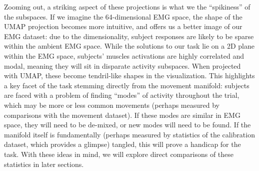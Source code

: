 \documentclass[../main.tex]{subfiles}
\begin{document}
Zooming out, a striking aspect of these projections is what we the ``spikiness'' of the subspaces. If we imagine the 64-dimensional EMG space, the shape of the UMAP projection becomes more intuitive, and offers us a better image of our EMG dataset: due to the dimensionality, subject responses are likely to be sparse within the ambient EMG space. While the solutions to our task lie on a 2D plane within the EMG space, subjects' muscles activations are highly correlated and modal, meaning they will sit in disparate activity subspaces. When projected with UMAP, these become tendril-like shapes in the visualization. This highlights a key facet of the task stemming directly from the movement manifold: subjects are faced with a problem of finding ``modes'' of activity throughout the trial, which may be more or less common movements (perhaps measured by comparisons with the movement dataset). If these modes are similar in EMG space, they will need to be de-mixed, or new modes will need to be found. If the manifold itself is fundamentally (perhaps measured by statistics of the calibration dataset, which provides a glimpse) tangled, this will prove a handicap for the task. With these ideas in mind, we will explore direct comparisons of these statistics in later sections.


\end{document}
